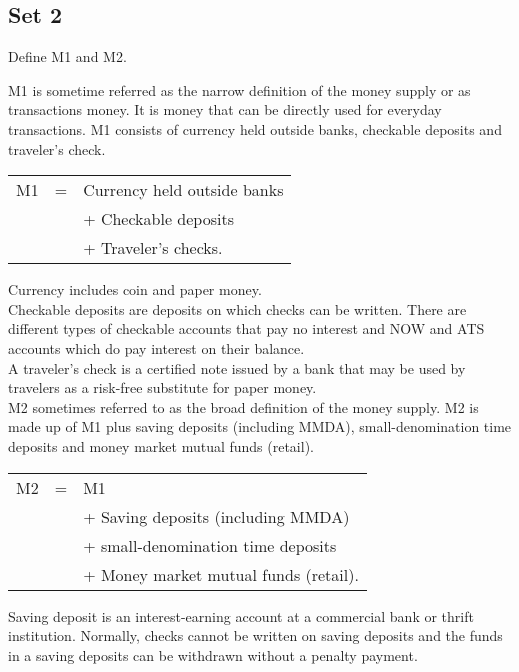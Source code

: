 \documentclass[12pt]{article}
\begin{document}
\subsection{Set 2}
\begin{prob}
	Define M1 and M2.
\end{prob}
\begin{soln}
	M1 is sometime referred as the narrow definition of the money supply or as transactions money. It is money that can be directly used for everyday transactions. M1 consists of currency held outside banks, checkable deposits and traveler's check.
	\begin{table}[H]
		\begin{tabular}{ccl}
			M1 & = & Currency held outside banks \\
			   &   & + Checkable deposits        \\
			   &   & + Traveler's checks.
		\end{tabular}
	\end{table}

	Currency includes coin and paper money.\\

	Checkable deposits are deposits on which checks can be written. There are different types of checkable accounts that pay no interest and NOW and ATS accounts which do pay interest on their balance.\\

	A traveler's check is a certified note issued by a bank that may be used by travelers as a risk-free substitute for paper money.\\

	M2 sometimes referred to as the broad definition of the money supply. M2 is made up of M1 plus saving deposits (including MMDA), small-denomination time deposits and money market mutual funds (retail).
	\begin{table}[H]
		\begin{tabular}{ccl}
			M2 & = & M1                                    \\
			   &   & + Saving deposits (including MMDA)    \\
			   &   & + small-denomination time deposits    \\
			   &   & + Money market mutual funds (retail).
		\end{tabular}
	\end{table}

	Saving deposit is an interest-earning account at a commercial bank or thrift institution. Normally, checks cannot be written on saving deposits and the funds in a saving deposits can be withdrawn without a penalty payment.\\


\end{soln}
\end{document}
